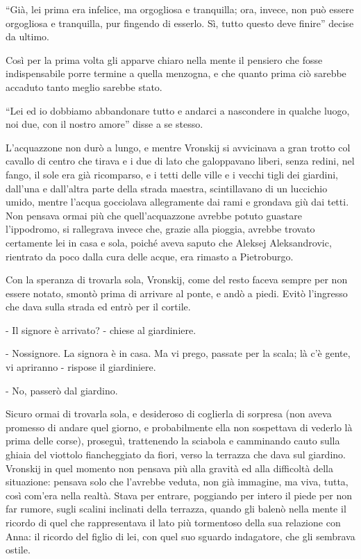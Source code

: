 ``Già, lei prima era infelice, ma orgogliosa e tranquilla; ora, invece, non può essere orgogliosa e tranquilla, pur fingendo di esserlo. Sì, tutto questo deve finire'' decise da ultimo. 

Così per la prima volta gli apparve chiaro nella mente il pensiero che fosse indispensabile porre termine a quella menzogna, e che quanto prima ciò sarebbe accaduto tanto meglio sarebbe stato. 

``Lei ed io dobbiamo abbandonare tutto e andarci a nascondere in qualche luogo, noi due, con il nostro amore'' disse a se stesso. 

L'acquazzone non durò a lungo, e mentre Vronskij si avvicinava a gran trotto col cavallo di centro che tirava e i due di lato che galoppavano liberi, senza redini, nel fango, il sole era già ricomparso, e i tetti delle ville e i vecchi tigli dei giardini, dall'una e dall'altra parte della strada maestra, scintillavano di un luccichio umido, mentre l'acqua gocciolava allegramente dai rami e grondava giù dai tetti. Non pensava ormai più che quell'acquazzone avrebbe potuto guastare l'ippodromo, si rallegrava invece che, grazie alla pioggia, avrebbe trovato certamente lei in casa e sola, poiché aveva saputo che Aleksej Aleksandrovic, rientrato da poco dalla cura delle acque, era rimasto a Pietroburgo. 

Con la speranza di trovarla sola, Vronskij, come del resto faceva sempre per non essere notato, smontò prima di arrivare al ponte, e andò a piedi. Evitò l'ingresso che dava sulla strada ed entrò per il cortile. 

- Il signore è arrivato? - chiese al giardiniere. 

- Nossignore. La signora è in casa. Ma vi prego, passate per la scala; là c'è gente, vi apriranno - rispose il giardiniere. 

- No, passerò dal giardino. 

Sicuro ormai di trovarla sola, e desideroso di coglierla di sorpresa (non aveva promesso di andare quel giorno, e probabilmente ella non sospettava di vederlo là prima delle corse), proseguì, trattenendo la sciabola e camminando cauto sulla ghiaia del viottolo fiancheggiato da fiori, verso la terrazza che dava sul giardino. Vronskij in quel momento non pensava più alla gravità ed alla difficoltà della situazione: pensava solo che l'avrebbe veduta, non già immagine, ma viva, tutta, così com'era nella realtà. Stava per entrare, poggiando per intero il piede per non far rumore, sugli scalini inclinati della terrazza, quando gli balenò nella mente il ricordo di quel che rappresentava il lato più tormentoso della sua relazione con Anna: il ricordo del figlio di lei, con quel suo sguardo indagatore, che gli sembrava ostile. 

